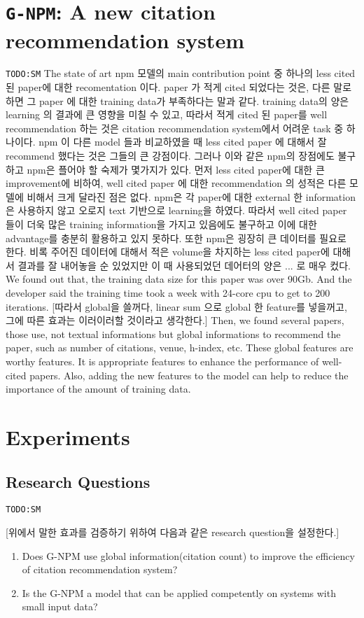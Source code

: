 \documentclass{llncs}
\newcommand{\name}{\texttt{G-NPM}\xspace}
\newcommand{\todo}[1]{\texttt{\color{red}TODO:#1}}
\begin{document}
\section{\name: A new citation recommendation system}
\todo{SM}
The state of art npm 모델의 main contribution point 중 하나의 less cited 된 paper에 대한 recomentation 이다. paper 가 적게 cited 되었다는 것은, 다른 말로 하면 그 paper 에 대한 training data가 부족하다는 말과 같다. training data의 양은 learning 의 결과에 큰 영향을 미칠 수 있고, 따라서 적게 cited 된 paper를 well recommendation 하는 것은 citation recommendation system에서 어려운 task 중 하나이다. npm 이 다른 model 들과 비교하였을 때 less cited paper 에 대해서 잘 recommend 했다는 것은 그들의 큰 강점이다.
그러나 이와 같은 npm의 장점에도 불구하고 npm은 플어야 할 숙제가 몇가지가 있다. 먼저 less cited paper에 대한 큰 improvement에 비하여, well cited paper 에 대한 recommendation 의 성적은 다른 모델에 비해서 크게 달라진 점은 없다. npm은 각 paper에 대한 external 한 information 은 사용하지 않고 오로지 text 기반으로 learning을 하였다. 따라서 well cited paper 들이 더욱 많은 training information을 가지고 있음에도 불구하고 이에 대한 advantage를 충분히 활용하고 있지 못하다. 또한 npm은 굉장히 큰 데이터를 필요로 한다. 비록 주어진 데이터에 대해서 적은 volume을 차지하는 less cited paper에 대해서 결과를 잘 내어놓을 순 있었지만 이 때 사용되었던 데어터의 양은 ... 로 매우 컸다. We found out that, the training data size for this paper was over 90Gb. And the developer said the training time took a week with 24-core cpu to get to 200 iterations.
[따라서 global을 쓸꺼다, linear sum 으로 global 한 feature를 넣을꺼고, 그에 따른 효과는 이러이러할 것이라고 생각한다.] Then, we found several papers, those use, not textual informations but global informations to recommend the paper, such as number of citations, venue, h-index, etc.
These global features are worthy features.
It is appropriate features to enhance the performance of well-cited papers.
Also, adding the new features to the model can help to reduce the importance of the amount of training data.

\section{Experiments}
\subsection{Research Questions}
\todo{SM}

[위에서 말한 효과를 검증하기 위하여 다음과 같은 research question을 설정한다.]
\begin{enumerate}
\item Does G-NPM use global information(citation count) to improve the efficiency of citation recommendation system?
\item Is the G-NPM a model that can be applied competently on systems with small input data?
\end{enumerate}
\end{document}
